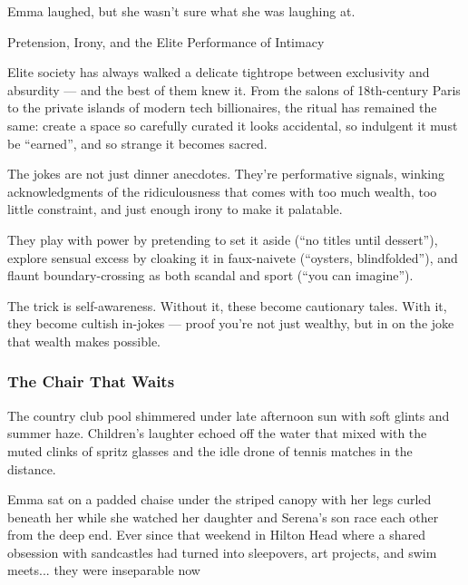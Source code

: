 Emma laughed, but she wasn’t sure what she was laughing at.

\medskip

\begin{HistoricalSidebar}{Pretension, Irony, and the Elite Performance of Intimacy}

  Elite society has always walked a delicate tightrope between exclusivity and absurdity — and the best 
  of them knew it. From the salons of 18th-century Paris to the private islands of modern tech 
  billionaires, the ritual has remained the same: create a space so carefully curated it looks 
  accidental, so indulgent it must be ``earned'', and so strange it becomes sacred.

  \medskip
  
  The jokes are not just dinner anecdotes. They’re performative signals, winking acknowledgments of the 
  ridiculousness that comes with too much wealth, too little constraint, and just enough irony to 
  make it palatable.

  \medskip
  
  They play with power by pretending to set it aside (“no titles until dessert”), explore sensual 
  excess by cloaking it in faux-naivete (“oysters, blindfolded”), and flaunt boundary-crossing as 
  both scandal and sport (“you can imagine”). 

  \medskip
  
  The trick is self-awareness. Without it, these become cautionary tales. With it, they become 
  cultish in-jokes — proof you’re not just wealthy, but in on the joke that wealth makes possible.
  
\end{HistoricalSidebar}

\subsubsection{The Chair That Waits}

The country club pool shimmered under late afternoon sun with soft glints and summer haze. Children’s laughter 
echoed off the water that mixed with the muted clinks of spritz glasses and the idle drone of tennis matches in 
the distance.

Emma sat on a padded chaise under the striped canopy with her legs curled beneath her while she watched her daughter 
and Serena’s son race each other from the deep end. Ever since that weekend in Hilton Head where a 
shared obsession with sandcastles had turned into sleepovers, art projects, and swim meets... they were inseparable now 

